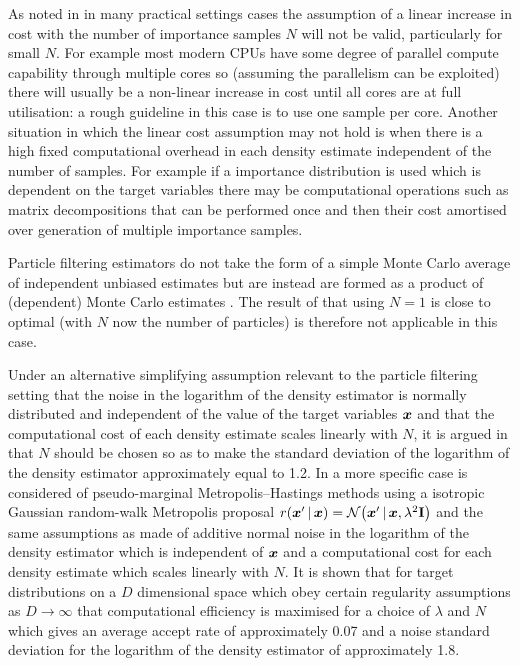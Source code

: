 As noted in \citep{sherlock2016pseudo} in many practical settings cases the assumption of a linear increase in cost with the number of importance samples $N$ will not be valid, particularly for small $N$. For example most modern \acp{CPU} have some degree of parallel compute capability through multiple cores so (assuming the parallelism can be exploited) there will usually be a non-linear increase in cost until all cores are at full utilisation: a rough guideline in this case is to use one sample per core. Another situation in which the linear cost assumption may not hold is when there is a high fixed computational overhead in each density estimate independent of the number of samples. For example if a importance distribution is used which is dependent on the target variables there may be computational operations such as matrix decompositions that can be performed once and then their cost amortised over generation of multiple importance samples. %

Particle filtering estimators do not take the form of a simple Monte Carlo average of independent unbiased estimates but are instead are formed as a product of (dependent) Monte Carlo estimates \citep{sherlock2016pseudo}. The result of \citep{sherlock2016pseudo} that using $N=1$ is close to optimal (with $N$ now the number of particles) is therefore not applicable in this case. 

Under an alternative simplifying assumption relevant to the particle filtering setting that the noise in the logarithm of the density estimator is normally distributed and independent of the value of the target variables $\boldsymbol{x}$ and that the computational cost of each density estimate scales linearly with $N$, it is argued in \citep{doucet2015efficient} that $N$ should be chosen so as to make the standard deviation of the logarithm of the density estimator approximately equal to 1.2. In \citep{sherlock2015efficiency} a more specific case is considered of pseudo-marginal Metropolis--Hastings methods using a isotropic Gaussian random-walk Metropolis proposal $r(\vct{x}'\gvn\vct{x}) = \nrm{\vct{x}'\gvn\vct{x},\lambda^2\mathbf{I}}$ and the same assumptions as \citep{doucet2015efficient} made of additive normal noise in the logarithm of the density estimator which is independent of $\boldsymbol{x}$ and a computational cost for each density estimate which scales linearly with $N$. It is shown that for target distributions on a $D$ dimensional space which obey certain regularity assumptions as $D \to \infty$ that computational efficiency is maximised for a choice of $\lambda$ and $N$ which gives an average accept rate of approximately 0.07 and a noise standard deviation for the logarithm of the density estimator of approximately 1.8.

